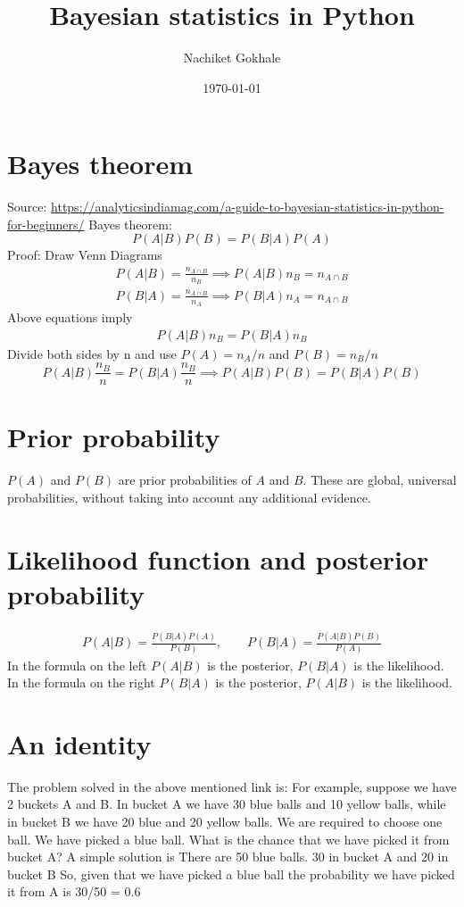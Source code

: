 \documentclass{article}
\newcommand{\beq}{\begin{equation}}
\newcommand{\eeq}{\end{equation}}
\newcommand{\ber}{\begin{eqnarray}}
\newcommand{\eer}{\end{eqnarray}}
\begin{document}
\title{Bayesian statistics in Python}
\author{Nachiket Gokhale}
\date{\today}
\maketitle
\section{Bayes theorem}
Source: \url{https://analyticsindiamag.com/a-guide-to-bayesian-statistics-in-python-for-beginners/}
Bayes theorem:
\beq
P(A|B)P(B) = P(B|A)P(A) 
\eeq
Proof: Draw Venn Diagrams
\ber
P(A|B) = \frac{n_{A\cap{B}}}{n_B} \implies P(A|B)n_B = n_{A\cap{B}}\\
P(B|A) = \frac{n_{A\cap{B}}}{n_A} \implies P(B|A)n_A = n_{A\cap{B}}
\eer
Above equations imply
\ber
P(A|B)n_B = P(B|A)n_B
\eer 
Divide both sides by n and use $P(A)=n_A/n$ and $P(B)=n_B/n$
\beq
\label{eqn:bayesidentity}
P(A|B)\frac{n_B}{n} = P(B|A)\frac{n_B}{n} \implies P(A|B)P(B) = P(B|A)P(B)
\eeq
\section{Prior probability}
$P(A)$ and $P(B)$ are prior probabilities of $A$ and $B$. These are global, universal probabilities, without taking into account any additional evidence.
\section{Likelihood function and posterior probability}
\ber
P(A|B) = \frac{P(B|A)P(A)}{P(B)}, \qquad P(B|A) = \frac{P(A|B)P(B)}{P(A)}
\eer
In the formula on the left $P(A|B)$ is the posterior, $P(B|A)$ is the likelihood.\\
In the formula on the right $P(B|A)$ is the posterior, $P(A|B)$ is the likelihood.
\section{An identity}
The problem solved in the above mentioned link is: For example, suppose we have 2 buckets A and B. 
In bucket A we have 30 blue balls and 10 yellow balls, while in bucket B we have 20 blue and 20 yellow balls.
We are required to choose one ball. We have picked a blue ball. What is the chance that we have picked 
it from bucket A? A simple solution is There are 50 blue balls. 30 in bucket A and 20 in bucket B
So, given that we have picked a blue ball the probability we have picked it from A is 30/50 = 0.6\\
\end{document}
